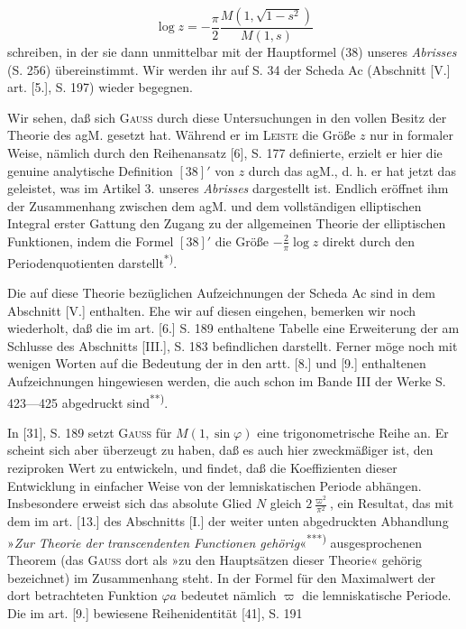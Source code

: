 \begin{equation*}\tag*{$[38]'$}\log z=-\frac\pi2\frac{M(1,\sqrt{1-s^2})}{M(1,s)}\end{equation*}
\noindent schreiben, in der sie dann unmittelbar mit der Hauptformel (38) unseres \textit{Abrisses} (S. 256) übereinstimmt. Wir werden ihr auf S. 34 der Scheda Ac (Abschnitt [V.] art. [5.], S. 197) wieder begegnen.
\par\indent Wir sehen, daß sich \textsc{Gauss} durch diese Untersuchungen in den vollen Besitz der Theorie des agM. gesetzt hat. Während er im \textsc{Leiste} die Größe $z$ nur in formaler Weise, nämlich durch den Reihenansatz [6], S. 177 definierte, erzielt er hier die genuine analytische Definition $[38]'$ von $z$ durch das agM., d. h. er hat jetzt das geleistet, was im Artikel 3. unseres \textit{Abrisses} dargestellt ist. Endlich eröffnet ihm der Zusammenhang zwischen dem agM. und dem vollständigen elliptischen Integral erster Gattung den Zugang zu der allgemeinen Theorie der elliptischen Funktionen, indem die Formel $[38]'$ die Größe $-\frac2\pi\log z$ direkt durch den Periodenquotienten darstellt\textsuperscript{*)}.
\par\indent Die auf diese Theorie bezüglichen Aufzeichnungen der Scheda Ac sind in dem Abschnitt [V.] enthalten. Ehe wir auf diesen eingehen, bemerken wir noch wiederholt, daß die im art. [6.] S. 189 enthaltene Tabelle eine Erweiterung der am Schlusse des Abschnitts [III.], S. 183 befindlichen darstellt. Ferner möge noch mit wenigen Worten auf die Bedeutung der in den artt. [8.] und [9.] enthaltenen Aufzeichnungen hingewiesen werden, die auch schon im Bande III der Werke S. 423—425 abgedruckt sind\textsuperscript{**)}.
\par\indent In [31], S. 189 setzt \textsc{Gauss} für $M(1,\sin\varphi)$ eine trigonometrische Reihe an. Er scheint sich aber überzeugt zu haben, daß es auch hier zweckmäßiger ist, den reziproken Wert zu entwickeln, und findet, daß die Koeffizienten dieser Entwicklung in einfacher Weise von der lemniskatischen Periode abhängen. Insbesondere erweist sich das absolute Glied $N$ gleich $2\frac{\varpi^2}{\pi^2}$, ein Resultat, das mit dem im art. [13.] des Abschnitts [I.] der weiter unten abgedruckten Abhandlung »\textit{Zur Theorie der transcendenten Functionen gehörig}«\textsuperscript{***)} ausgesprochenen Theorem (das \textsc{Gauss} dort als »zu den Hauptsätzen dieser Theorie« gehörig bezeichnet) im Zusammenhang steht. In der Formel für den Maximalwert der dort betrachteten Funktion $\varphi a$ bedeutet nämlich $\varpi$ die lemniskatische Periode. Die im art. [9.] bewiesene Reihenidentität [41], S. 191

